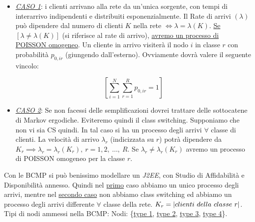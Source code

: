 \begin{itemize}

\item{\textit{\underline{CASO 1}}}: i clienti arrivano alla rete da un'unica sorgente, con tempi di interarrivo indipendenti e distribuiti esponenzialmente. Il Rate di arrivi $(\lambda)$ può dipendere dal numero di clienti $K$ nella rete $\iff \lambda=\lambda(K)$. \underline{Se $[\lambda\neq\lambda(K)]$} (si riferisce al rate di arrivo), \newline
\underline{avremo un processo di POISSON omogeneo}. Un cliente in arrivo visiterà il nodo $i$ in classe $r$ con probabilità $p_{0,ir}$ (giungendo dall'esterno). Ovviamente dovrà valere il seguente vincolo:

\[
	[\sum_{i=1}^N{\sum_{r=1}^R{p_{0,ir}=1}}]
\]

\item{\textit{\underline{CASO 2}}}: Se non facessi delle semplificazioni dovrei trattare delle sottocatene di Markov ergodiche. Eviteremo quindi il class switching. Supponiamo che non vi sia CS quindi. In tal caso si ha un processo degli arrivi $\forall$ classe di clienti. La velocità di arrivo $\lambda_r$ (indicizzata su $r$) potrà dipendere da $K_r \implies \lambda_r=\lambda_r(K_r),\ r=1,2,\ \dots,\ R$. Se $\lambda_r\neq\lambda_r(K_r)$ avremo un processo di POISSON omogeneo per la classe $r$.
\end{itemize}

Con le BCMP si può benissimo modellare un \textit{J2EE}, con Studio di Affidabilità e Disponibilità annesso. Quindi nel \underline{primo} caso abbiamo un unico processo degli arrivi, mentre nel \underline{secondo caso} non abbiamo class switching ed abbiamo un processo degli arrivi differente $\forall$ classe della rete. $K_r=\cardinality{clienti\ della\ classe\ r}$. Tipi di nodi ammessi nella BCMP: Nodi: \{\underline{type 1}, \underline{type 2}, \underline{type 3}, \underline{type 4}\}.

